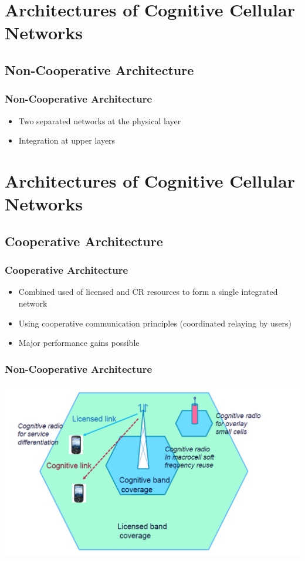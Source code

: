 \documentclass{beamer}
\begin{document}
\section{Architectures of Cognitive Cellular Networks}
\subsection{Non-Cooperative Architecture}
\begin{frame}
\frametitle{Non-Cooperative Architecture}
\begin{itemize}
\item Two separated networks at the physical layer
\item Integration at upper layers

\end{itemize}
\end{frame}

\section{Architectures of Cognitive Cellular Networks}
\subsection{Cooperative Architecture}
\begin{frame}
\frametitle{Cooperative Architecture}
\begin{itemize}
\item Combined used of licensed and CR resources to form a single integrated network
\item Using cooperative communication principles (coordinated relaying by users)
\item Major performance gains possible
\end{itemize}
\end{frame}

\begin{frame}
\frametitle{Non-Cooperative Architecture}
\includegraphics[scale=0.5]{nonartch}
\end{frame}
\end{document}
